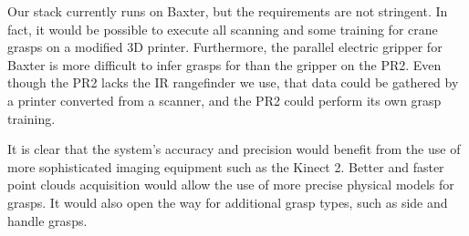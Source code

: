 \documentclass{article}
\begin{document}
Our stack currently runs on Baxter, but the requirements are not
stringent.  In fact, it would be possible to execute all scanning and
some training for crane grasps on a modified 3D printer. Furthermore,
the parallel electric gripper for Baxter is more difficult to infer
grasps for than the gripper on the PR2.  Even though the PR2 lacks the
IR rangefinder we use, that data could be gathered by a printer
converted from a scanner, and the PR2 could perform its own grasp
training.

It is clear that the system's accuracy and precision would benefit
from the use of more sophisticated imaging equipment such as the
Kinect 2. Better and faster point clouds acquisition would allow the
use of more precise physical models for grasps. It would also open the
way for additional grasp types, such as side and handle grasps.



{\tiny


}
\end{document}
